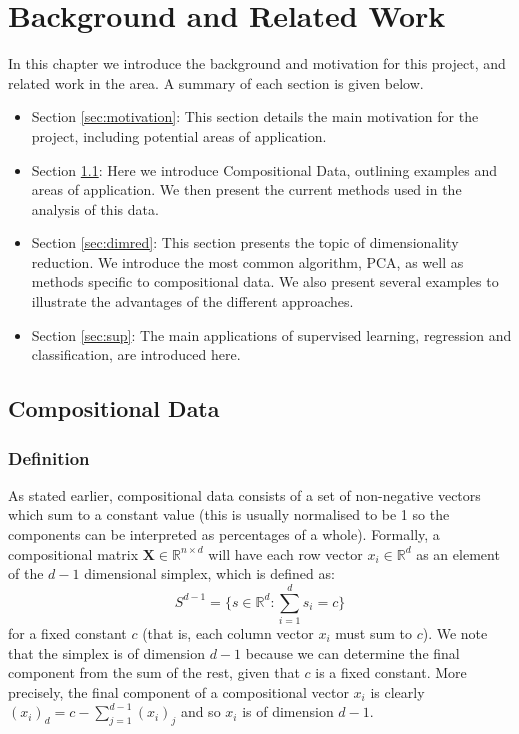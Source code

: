 \chapter{Background and Related Work}
\label{cha:background}
In this chapter we introduce the background and motivation for this project, and related work in the area. A summary of each section is given below.

\begin{itemize}
    \item Section \ref{sec:motivation}: This section details the main motivation for the project, including potential areas of application.
    \item Section \ref{sec:comp}: Here we introduce Compositional Data, outlining examples and areas of application. We then present the current methods used in the analysis of this data. 
    \item Section \ref{sec:dimred}: This section presents the topic of dimensionality reduction. We introduce the most common algorithm, PCA, as well as methods specific to compositional data. We also present several examples to illustrate the advantages of the different approaches.  
    \item Section \ref{sec:sup}: The main applications of supervised learning, regression and classification, are introduced here. 
\end{itemize} \pagebreak

\section{Compositional Data}
\label{sec:comp}

\subsection{Definition}
As stated earlier, compositional data consists of a set of non-negative vectors which sum to a constant value (this is usually normalised to be 1 so the components can be interpreted as percentages of a whole). Formally, a compositional matrix $\mathbf{X} \in \mathbb{R}^{n\times d}$ will have each row vector $x_i \in \mathbb{R}^d$ as an element of the $d-1$ dimensional simplex, which is defined as: $$S^{d-1} = \{s \in \mathbb{R}^d : \sum_{i=1}^{d}s_i = c\}$$ for a fixed constant $c$ (that is, each column vector $x_i$ must sum to $c$). We note that the simplex is of dimension $d-1$ because we can determine the final component from the sum of the rest, given that $c$ is a fixed constant. More precisely, the final component of a compositional vector $x_i$ is clearly $(x_i)_{d} =  c - \sum_{j=1}^{d-1}(x_i)_j$ and so $x_i$ is of dimension $d-1$.   


